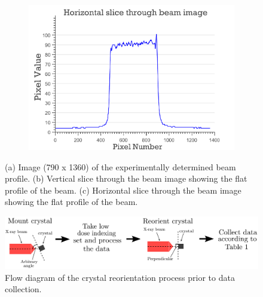 \begin{figure}
    \ContinuedFloat
    \begin{subfigure}[b]{1.0\textwidth}
        \centering
        \includegraphics[width=\textwidth]{figures/dwd/beamslice_horizontal.pdf}
        \caption{}
        \label{fig:Hamburg beamslice horizontal}
    \end{subfigure}
    \caption[Beam profile at beamline P14, PETRA III, Hamburg.]{(a) Image (790 x 1360) of the experimentally determined beam profile.
    (b) Vertical slice through the beam image showing the flat profile of the beam.
    (c) Horizontal slice through the beam image showing the flat profile of the beam.}
    \label{fig: Hamburg beam pgm and slice}
\end{figure}

\begin{figure}
  \centering
    \includegraphics[width=1\textwidth]{figures/dwd/initial_indexing.pdf}
    \caption[Flow diagram of the crystal reorientation process prior to data collection at PETRA III.]{Flow diagram of the crystal reorientation process prior to data collection.}
    \label{fig: indexing flow diagram}
\end{figure}

